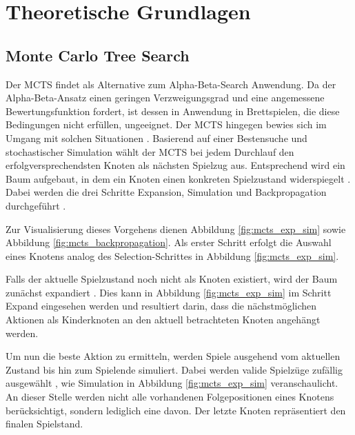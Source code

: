 \documentclass[12pt,a4paper]{article}
\begin{document}
\newpage

\section{Theoretische Grundlagen}

\subsection{Monte Carlo Tree Search}
Der MCTS findet als Alternative zum Alpha-Beta-Search Anwendung. Da der Alpha-Beta-Ansatz einen geringen Verzweigungsgrad und eine angemessene Bewertungsfunktion fordert, ist dessen in Anwendung in Brettspielen, die diese Bedingungen nicht erfüllen, ungeeignet. Der MCTS hingegen bewies sich im Umgang mit solchen Situationen \cite{Chaslot2008}.
Basierend auf einer Bestensuche und stochastischer Simulation  wählt der MCTS bei jedem Durchlauf den erfolgversprechendsten Knoten als nächsten Spielzug aus. Entsprechend wird ein Baum aufgebaut, in dem ein Knoten einen konkreten Spielzustand widerspiegelt \cite{Chaslot2008}. Dabei werden die drei Schritte Expansion, Simulation und Backpropagation durchgeführt \cite{Chaslot2008}.

Zur Visualisierung dieses Vorgehens dienen Abbildung \ref{fig:mcts_exp_sim} sowie Abbildung \ref{fig:mcts_backpropagation}. 
Als erster Schritt erfolgt die Auswahl eines Knotens analog des \glqq{}Selection\grqq{}-Schrittes in Abbildung \ref{fig:mcts_exp_sim}.

Falls der aktuelle Spielzustand noch nicht als Knoten existiert, wird der Baum zunächst expandiert \cite{Chaslot2008}. Dies kann in Abbildung \ref{fig:mcts_exp_sim} im Schritt \glqq{}Expand\grqq{} eingesehen werden und resultiert darin, dass die nächstmöglichen Aktionen als Kinderknoten an den aktuell betrachteten Knoten angehängt werden.

Um nun die beste Aktion zu ermitteln, werden Spiele ausgehend vom aktuellen Zustand bis hin zum Spielende simuliert. Dabei werden valide Spielzüge zufällig ausgewählt \cite{Chaslot2008}, wie \glqq{}Simulation\grqq{} in Abbildung \ref{fig:mcts_exp_sim} veranschaulicht. An dieser Stelle werden nicht alle vorhandenen Folgepositionen eines Knotens berücksichtigt, sondern lediglich eine davon. Der letzte Knoten repräsentiert den finalen Spielstand.
\end{document}
